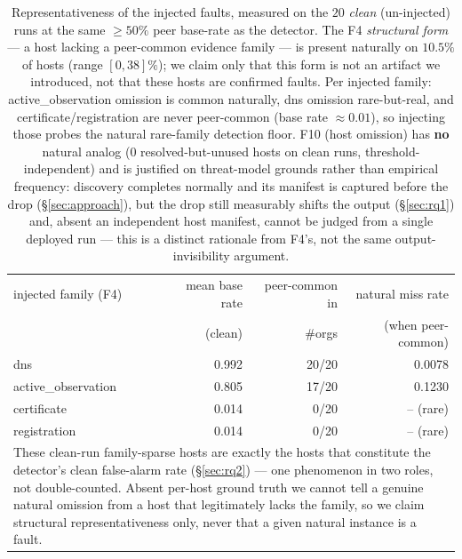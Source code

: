 \begin{table}[t]\centering\small
\caption{Representativeness of the injected faults, measured on the $20$ \emph{clean} (un-injected) runs at the same $\geq50\%$ peer base-rate as the detector. The F4 \emph{structural form} --- a host lacking a peer-common evidence family --- is present naturally on $10.5\%$ of hosts (range $[0,38]\%$); we claim only that this form is not an artifact we introduced, not that these hosts are confirmed faults. Per injected family: active\_observation omission is common naturally, dns omission rare-but-real, and certificate/registration are never peer-common (base rate $\approx0.01$), so injecting those probes the natural rare-family detection floor. F10 (host omission) has \textbf{no} natural analog ($0$ resolved-but-unused hosts on clean runs, threshold-independent) and is justified on threat-model grounds rather than empirical frequency: discovery completes normally and its manifest is captured before the drop (\S\ref{sec:approach}), but the drop still measurably shifts the output (\S\ref{sec:rq1}) and, absent an independent host manifest, cannot be judged from a single deployed run --- this is a distinct rationale from F4's, not the same output-invisibility argument.}
\label{tab:representativeness}
\begin{tabular}{lrrr}\toprule
injected family (F4) & mean base rate & peer-common in & natural miss rate\\
 & (clean) & \#orgs & (when peer-common)\\\midrule
dns & 0.992 & 20/20 & 0.0078\\
active\_observation & 0.805 & 17/20 & 0.1230\\
certificate & 0.014 & 0/20 & -- (rare)\\
registration & 0.014 & 0/20 & -- (rare)\\
\midrule
\multicolumn{4}{p{.9\linewidth}}{\footnotesize These clean-run family-sparse hosts are exactly the hosts that constitute the detector's clean false-alarm rate (\S\ref{sec:rq2}) --- one phenomenon in two roles, not double-counted. Absent per-host ground truth we cannot tell a genuine natural omission from a host that legitimately lacks the family, so we claim structural representativeness only, never that a given natural instance is a fault.}\\
\bottomrule\end{tabular}\end{table}
